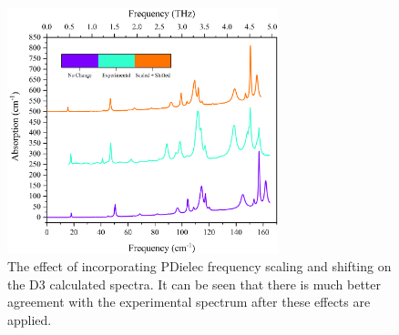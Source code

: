 \begin{figure}[h]
    \centering
    \includegraphics[width=0.7\textwidth]{Figures/Spectra/ScalCompG.png}
    \captionsetup{font = footnotesize, justification = centering}
    \caption[The Effect of Incorporating PDielec Frequency Scaling and Shifting on the D3 Calculated Terahertz Absorption Spectra]{The effect of incorporating PDielec frequency scaling and shifting on the D3 calculated spectra. It can be seen that there is much better agreement with the experimental spectrum after these effects are applied.}
    \label{fig:scaling}
\end{figure}

